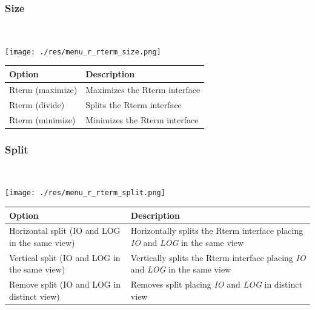 \hypertarget{menu_view_r_rterm_size}{}
\subsubsection{Size}\\

\texttt{[image: ./res/menu\_r\_rterm\_size.png]}\\

\begin{scriptsize}\begin{tabularx}{\textwidth}{>{\hsize=0.3\hsize}X>{\hsize=0.7\hsize}X}\\
    \hline
    \textbf{Option} & \textbf{Description} \\
    \hline
    Rterm (maximize) & Maximizes the Rterm interface \\
    Rterm (divide) & Splits the Rterm interface \\
    Rterm (minimize) & Minimizes the Rterm interface \\
    \hline
  \end{tabularx}\end{scriptsize}


\hypertarget{menu_view_r_rterm_split}{}
\subsubsection{Split}\\

\texttt{[image: ./res/menu\_r\_rterm\_split.png]}\\

\begin{scriptsize}\begin{tabularx}{\textwidth}{>{\hsize=1\hsize}X>{\hsize=0.7\hsize}X}\\
    \hline
    \textbf{Option} & \textbf{Description} \\
    \hline
    Horizontal split (IO and LOG in the same view) & Horizontally splits the Rterm interface placing \textit{IO} and \textit{LOG} in the same view \\
    Vertical split (IO and LOG in the same view) & Vertically splits the Rterm interface placing \textit{IO} and \textit{LOG} in the same view \\
    Remove split (IO and LOG in distinct view) & Removes split placing \textit{IO} and \textit{LOG} in distinct view \\
    \hline
  \end{tabularx}\end{scriptsize}


